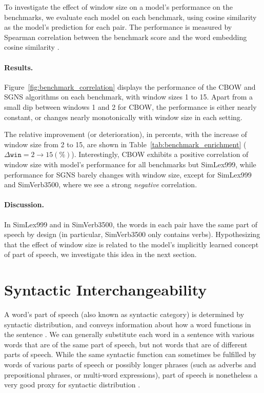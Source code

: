 \documentclass[11pt,a4paper]{article}
\begin{document}
    To investigate the effect of window size on a model's performance on the benchmarks,
    we evaluate each model on each benchmark, using cosine similarity
    as the model's prediction for each pair.
    The performance is measured by Spearman correlation between the benchmark score
    and the word embedding cosine similarity \cite{levy2015improving}.
    
    \paragraph{Results.}
    
    Figure~\ref{fig:benchmark_correlation} displays the performance of the CBOW and SGNS
    algorithms on each benchmark, with window sizes 1 to 15.
    Apart from a small dip between windows 1 and 2 for
    CBOW,
    the performance is either nearly constant,
    or changes nearly monotonically with window size in each setting.
    
    The relative improvement (or deterioration),
    in percents, with the increase of window size from 2 to 15,
    are shown in Table~\ref{tab:benchmark_enrichment} ($\Delta \mathtt{win}=2\to 15 (\%)$).
    Interestingly, CBOW exhibits a positive correlation of window size with model's performance
    for all benchmarks but SimLex999,
    while performance for SGNS barely changes with window size,
    except for SimLex999 and SimVerb3500, where we see a strong \textit{negative} correlation.
    
    \paragraph{Discussion.}
    
    In SimLex999 and in SimVerb3500, the words in each pair have the same part of speech by design
    (in particular, SimVerb3500 only contains verbs).
    Hypothesizing that the effect of window size is related to the model's
    implicitly learned concept of part of speech, we investigate this idea in the next section.
    
    
    \section{Syntactic Interchangeability}\label{sec:interchangeability}
    
    A word's part of speech (also known as syntactic category)
    is determined by syntactic distribution, and
    conveys information about how a word functions in the sentence \cite{carnie2002syntax}.
    We can generally substitute each word in a sentence
    with various words that are of the same part of speech,
    but not words that are of different parts of speech.
    While the same syntactic function can sometimes be fulfilled by words of
    various parts of speech or possibly longer phrases (such as adverbs and
    prepositional phrases, or multi-word expressions),
    part of speech is nonetheless a very good proxy for syntactic distribution
    \cite{W04-2404}.
    
\end{document}
